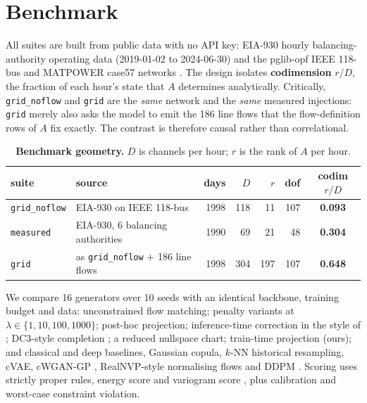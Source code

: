 \documentclass{article}
\newcommand{\dataset}[1]{\texttt{#1}}
\begin{document}
\section{Benchmark}\label{sec:benchmark}
All suites are built from public data with no API key: EIA-930 hourly
balancing-authority operating data (2019-01-02 to 2024-06-30) and the pglib-opf IEEE
118-bus and MATPOWER case57 networks \citep{pglib2021,zimmerman2011matpower,birchfield2017synthetic}.
The design isolates \textbf{codimension} $r/D$, the fraction of each hour's state that
$A$ determines analytically. Critically, \dataset{grid\_noflow} and \dataset{grid} are
the \emph{same} network and the \emph{same} measured injections: \dataset{grid} merely
also asks the model to emit the 186 line flows that the flow-definition rows of $A$ fix
exactly. The contrast is therefore causal rather than correlational.

\begin{table}[t]\centering\small
\caption{\textbf{Benchmark geometry.} $D$ is channels per hour; $r$ is the rank of $A$ per hour.}\label{tab:geom}
\begin{tabular}{llrrrrc}\toprule
suite & source & days & $D$ & $r$ & dof & codim $r/D$\\\midrule
\dataset{grid\_noflow} & EIA-930 on IEEE 118-bus & 1998 & 118 & 11 & 107 & \textbf{0.093}\\
\dataset{measured} & EIA-930, 6 balancing authorities & 1990 & 69 & 21 & 48 & \textbf{0.304}\\
\dataset{grid} & as \dataset{grid\_noflow} $+$ 186 line flows & 1998 & 304 & 197 & 107 & \textbf{0.648}\\
\bottomrule\end{tabular}\end{table}

We compare 16 generators over 10 seeds with an identical backbone, training budget and data: unconstrained flow matching; penalty variants at $\lambda\in\{1,10,100,1000\}$; post-hoc projection; inference-time correction in the style of \citep{utkarsh2025pcfm}; DC3-style completion \citep{donti2021dc3}; a reduced nullspace chart; train-time projection (ours); and classical and deep baselines, Gaussian copula, $k$-NN historical resampling, cVAE, cWGAN-GP \citep{arjovsky2017wgan}, RealNVP-style normalising flows \citep{dumas2022normflows,cramer2022pcanf} and DDPM \citep{ho2020denoising}. Scoring uses strictly proper rules, energy score and variogram score \citep{gneiting2007strictly,gneiting2008energyscore,scheuerer2015variogram}, plus calibration and worst-case constraint violation.
\end{document}
